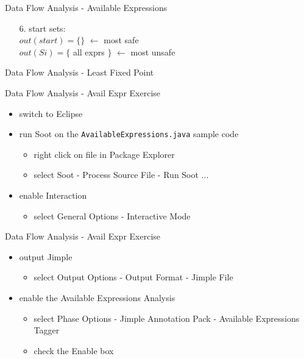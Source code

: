 \documentclass[mcgill,slideColor,colorBG,pdf]{prosper}
\begin{document}
\begin{slide} {Data Flow Analysis - Available Expressions}
\begin{itemize}
\item[6.] start sets:\\
$out(start) = \{\}$ $\leftarrow$ most safe\\
$out(Si) = \{$ all exprs $\} $ $\leftarrow$ most unsafe \\
\end{itemize}
\end{slide}

\begin{slide} {Data Flow Analysis - Least Fixed Point}
\begin{center}\end{center}
\end{slide}

\begin{slide} {Data Flow Analysis - Avail Expr Exercise}
\begin{itemize}
\item switch to Eclipse
\item run Soot on the \texttt{AvailableExpressions.java} sample code
\begin{itemize}
\item right click on file in Package Explorer
\item select Soot - Process Source File - Run Soot ...
\end{itemize}
\item enable Interaction 
\begin{itemize}
\item select General Options - Interactive Mode
\end{itemize}
\end{itemize}
\end{slide}

\begin{slide} {Data Flow Analysis - Avail Expr Exercise}
\begin{itemize}
\item output Jimple
\begin{itemize}
\item select Output Options - Output Format - Jimple File
\end{itemize}
\item enable the Available Expressions Analysis
\begin{itemize}
\item select Phase Options - Jimple Annotation Pack - Available Expressions Tagger
\item check the Enable box
\end{itemize}
\end{itemize}
\end{slide}
\end{document}
